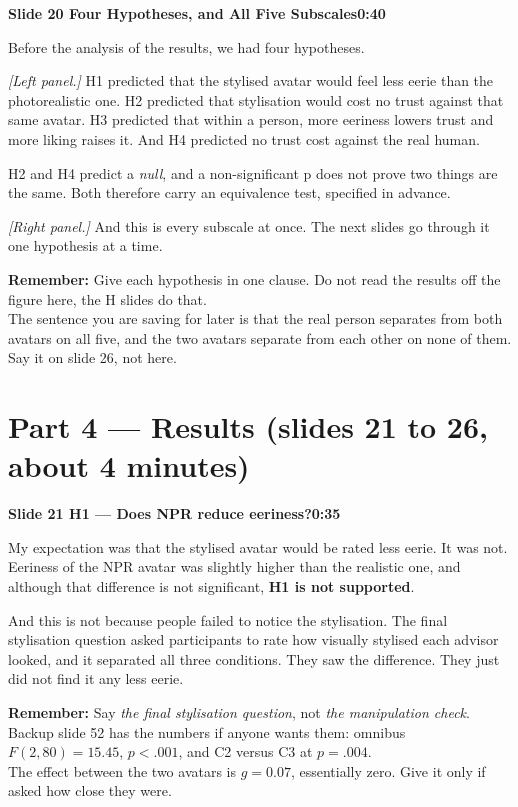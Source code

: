 \documentclass[11pt,a4paper]{article}
\newcommand{\slidehead}[3]{%
  \needspace{5\baselineskip}
  \vspace{0.9em}
  \noindent\colorbox{knblue}{\parbox{0.978\textwidth}{\vspace{1pt}\color{white}\textbf{Slide #1 \quad #2}\hfill\textbf{#3}\vspace{1pt}}}
  \vspace{0.35em}\par}
\newcommand{\remind}[1]{%
  \vspace{0.15em}
  \noindent\colorbox{knlight}{\parbox{0.972\textwidth}{\small\color{knblue}\textbf{Remember:} #1}}
  \vspace{0.2em}\par}
\newcommand{\pointto}[1]{{\color{knaccent}\textit{[#1]}}}
\begin{document}
\slidehead{20}{Four Hypotheses, and All Five Subscales}{0:40}

Before the analysis of the results, we had four hypotheses.

\pointto{Left panel.} H1 predicted that the stylised avatar would feel less eerie than the photorealistic one. H2 predicted that stylisation would cost no trust against that same avatar. H3 predicted that within a person, more eeriness lowers trust and more liking raises it. And H4 predicted no trust cost against the real human.

H2 and H4 predict a \emph{null}, and a non-significant p does not prove two things are the same. Both therefore carry an equivalence test, specified in advance.

\pointto{Right panel.} And this is every subscale at once. The next slides go through it one hypothesis at a time.

\remind{Give each hypothesis in one clause. Do not read the results off the figure here, the H slides do that.\\[0.4em] The sentence you are saving for later is that the real person separates from both avatars on all five, and the two avatars separate from each other on none of them. Say it on slide 26, not here.}

\vspace{0.6em}

\section*{\color{knblue}Part 4 — Results (slides 21 to 26, about 4 minutes)}

\slidehead{21}{H1 — Does NPR reduce eeriness?}{0:35}

My expectation was that the stylised avatar would be rated less eerie. It was not. Eeriness of the NPR avatar was slightly higher than the realistic one, and although that difference is not significant, \textbf{H1 is not supported}.

And this is not because people failed to notice the stylisation. The final stylisation question asked participants to rate how visually stylised each advisor looked, and it separated all three conditions. They saw the difference. They just did not find it any less eerie.

\remind{Say \emph{the final stylisation question}, not \emph{the manipulation check}.\\[0.4em] Backup slide 52 has the numbers if anyone wants them: omnibus $F(2,80)=15.45$, $p<.001$, and C2 versus C3 at $p=.004$.\\[0.4em] The effect between the two avatars is $g=0.07$, essentially zero. Give it only if asked how close they were.}
\end{document}
